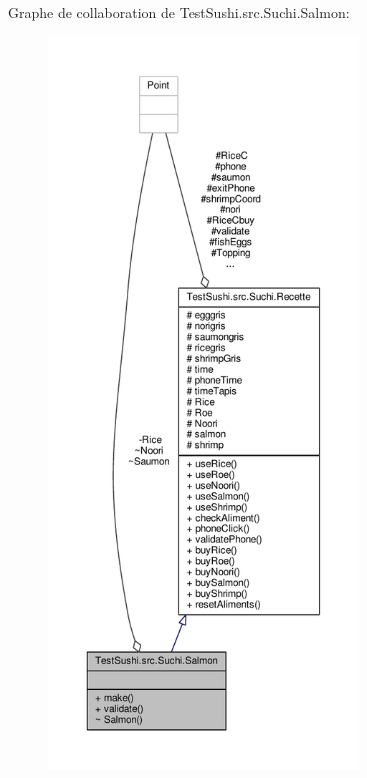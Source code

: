 Graphe de collaboration de Test\+Sushi.\+src.\+Suchi.\+Salmon\+:\nopagebreak
\begin{figure}[H]
\begin{center}
\leavevmode
\includegraphics[height=550pt]{classTestSushi_1_1src_1_1Suchi_1_1Salmon__coll__graph}
\end{center}
\end{figure}

